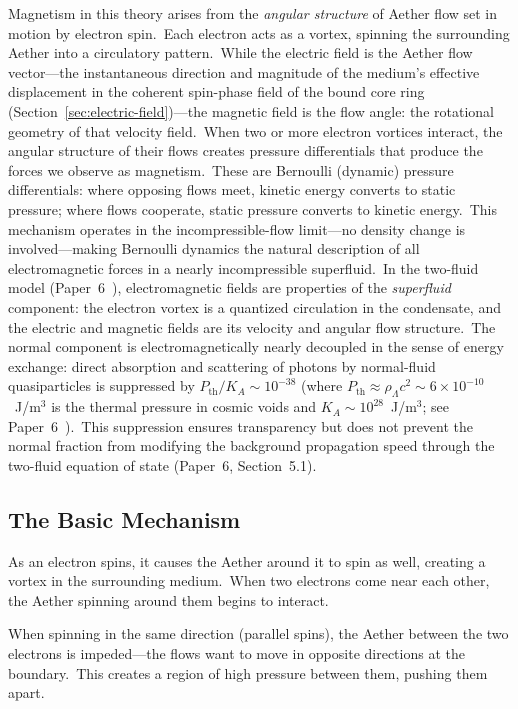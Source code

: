 ﻿\documentclass[12pt,letterpaper]{article}
\newcommand{\Ka}{K_{\!A}}
\begin{document}
Magnetism in this theory arises from the \emph{angular structure} of Aether flow set in
motion by electron spin.\ Each electron acts as a vortex, spinning the surrounding Aether
into a circulatory pattern.\ While the electric field is the Aether flow vector---the
instantaneous direction and magnitude of the medium's effective displacement in the
coherent spin-phase field of the bound core ring (Section~\ref{sec:electric-field})---the
magnetic field is the flow angle: the rotational geometry of that velocity field.\ When two or more electron vortices
interact, the angular structure of their flows creates pressure differentials that produce
the forces we observe as magnetism.\ These are Bernoulli (dynamic) pressure
differentials: where opposing flows meet, kinetic energy converts to static
pressure; where flows cooperate, static pressure converts to kinetic energy.\
This mechanism operates in the incompressible-flow limit---no density change
is involved---making Bernoulli dynamics the natural description of all
electromagnetic forces in a nearly incompressible superfluid.\ In the two-fluid model
(Paper~6~\cite{otto-cosmology}), electromagnetic fields are properties of the
\emph{superfluid} component: the electron vortex is a quantized circulation in
the condensate, and the electric and magnetic fields are its velocity and
angular flow structure.\ The normal component is electromagnetically nearly decoupled in the sense
of energy exchange: direct absorption and scattering of photons by
normal-fluid quasiparticles is suppressed by
$P_{\mathrm{th}}/\Ka \sim 10^{-38}$
(where $P_{\mathrm{th}} \approx \rho_\Lambda c^2 \sim 6\times10^{-10}$~J/m$^3$
is the thermal pressure in cosmic voids and $\Ka \sim 10^{28}$~J/m$^3$;
see Paper~6~\cite{otto-cosmology}).\ This suppression ensures transparency but
does not prevent the normal fraction from modifying the background propagation
speed through the two-fluid equation of state (Paper~6, Section~5.1).


\subsection{The Basic Mechanism}

As an electron spins, it causes the Aether around it to spin as well, creating a vortex
in the surrounding medium.\ When two electrons come near each other, the Aether spinning
around them begins to interact.

When spinning in the same direction (parallel spins), the Aether between the two electrons
is impeded---the flows want to move in opposite directions at the boundary.\ This creates
a region of high pressure between them, pushing them apart.
\end{document}
